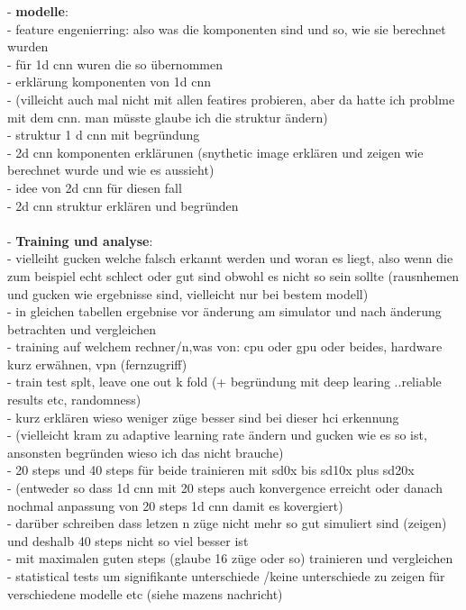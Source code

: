 - \textbf{modelle}:\\
- feature engenierring: also was die komponenten sind und so, wie sie berechnet wurden\\
- für 1d cnn wuren die so übernommen\\
- erklärung komponenten von 1d cnn \\
- (villeicht auch mal nicht mit allen featires probieren, aber da hatte ich problme mit dem cnn. man müsste glaube ich die struktur ändern)\\
- struktur 1 d cnn mit begründung\\ 
- 2d cnn komponenten erklärunen (snythetic image erklären und zeigen wie berechnet wurde und wie es aussieht)\\
- idee von 2d cnn für diesen fall\\
- 2d cnn struktur erklären und begründen\\\\

- \textbf{Training und analyse}:\\
- vielleiht gucken welche falsch erkannt werden und woran es liegt, also wenn die zum beispiel echt schlect oder gut sind obwohl es nicht so sein sollte (rausnhemen und gucken wie ergebnisse sind, vielleicht nur bei bestem modell)\\
- in gleichen tabellen ergebnise vor änderung am simulator und nach änderung betrachten und vergleichen\\
- training auf welchem rechner/n,was von: cpu oder gpu oder beides, hardware kurz erwähnen, vpn (fernzugriff)\\
- train test splt, leave one out k fold (+ begründung mit deep learing ..reliable results etc, randomness) \\
- kurz erklären wieso weniger züge besser sind bei dieser hci erkennung\\
- (vielleicht kram zu adaptive learning rate ändern und gucken wie es so ist, ansonsten begründen wieso ich das nicht brauche) \\
- 20 steps und 40 steps für beide trainieren mit sd0x bis sd10x plus sd20x\\
- (entweder so dass 1d cnn mit 20 steps auch konvergence erreicht oder danach nochmal anpassung von 20 steps 1d cnn damit es kovergiert)\\
- darüber schreiben dass letzen n züge nicht mehr so gut simuliert sind (zeigen) und deshalb 40 steps nicht so viel besser ist \\
- mit maximalen guten steps (glaube 16 züge oder so) trainieren und vergleichen\\
- statistical tests um signifikante unterschiede /keine unterschiede zu zeigen für verschiedene modelle etc (siehe mazens nachricht)\\


